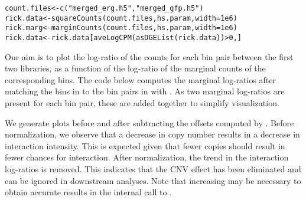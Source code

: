 \documentclass{report}\usepackage[]{graphicx}\usepackage[usenames,dvipsnames]{color}
\newcommand{\hlnum}[1]{\textcolor[rgb]{0.816,0.125,0.439}{#1}}%
\newcommand{\hlstr}[1]{\textcolor[rgb]{0.251,0.627,0.251}{#1}}%
\newcommand{\hlopt}[1]{\textcolor[rgb]{0,0,0}{#1}}%
\newcommand{\hlstd}[1]{\textcolor[rgb]{0.251,0.251,0.251}{#1}}%
\newcommand{\hlkwb}[1]{\textcolor[rgb]{0,0,0}{#1}}%
\newcommand{\hlkwc}[1]{\textcolor[rgb]{0.251,0.251,0.251}{#1}}%
\newcommand{\hlkwd}[1]{\textcolor[rgb]{0.878,0.439,0.125}{#1}}%
\newenvironment{knitrout}{}{} %
\begin{document}
\begin{knitrout}
\color{fgcolor}\begin{kframe}
\begin{alltt}
\hlstd{count.files} \hlkwb{<-} \hlkwd{c}\hlstd{(}\hlstr{"merged_erg.h5"}\hlstd{,} \hlstr{"merged_gfp.h5"}\hlstd{)}
\hlstd{rick.data} \hlkwb{<-} \hlkwd{squareCounts}\hlstd{(count.files, hs.param,} \hlkwc{width}\hlstd{=}\hlnum{1e6}\hlstd{)}
\hlstd{rick.marg} \hlkwb{<-} \hlkwd{marginCounts}\hlstd{(count.files, hs.param,} \hlkwc{width}\hlstd{=}\hlnum{1e6}\hlstd{)}
\hlstd{rick.data} \hlkwb{<-} \hlstd{rick.data[}\hlkwd{aveLogCPM}\hlstd{(}\hlkwd{asDGEList}\hlstd{(rick.data))} \hlopt{>} \hlnum{0}\hlstd{,]}
\end{alltt}
\end{kframe}
\end{knitrout}

Our aim is to plot the log-ratio of the counts for each bin pair between the first two libraries, as a function of the log-ratio of the marginal counts of the corresponding bins.
The code below computes the marginal log-ratios after matching the bins in  to the bin pairs in  with .
As two marginal log-ratios are present for each bin pair, these are added together to simplify visualization.

\begin{knitrout}
\color{fgcolor}
\end{knitrout}

We generate plots before and after subtracting the offsets computed by .
Before normalization, we observe that a decrease in copy number results in a decrease in interaction intensity.
This is expected given that fewer copies should result in fewer chances for interaction.
After normalization, the trend in the interaction log-ratios is removed.
This indicates that the CNV effect has been eliminated and can be ignored in downstream analyses.
Note that increasing  may be necessary to obtain accurate results in the internal call to .
\end{document}
